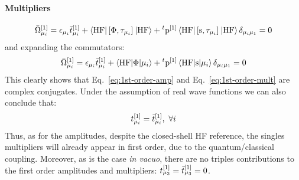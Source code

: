 \paragraph*{Multipliers}
\begin{equation}%
  \bar{\Omega}_{\mu_i}^{[1]} =
    \denom{\mu_i}\tbar{\mu_i}^{[1]}
    + \braket{\mathrm{HF} | \commutator{\Phi}{\cluster{\mu_i}} | \mathrm{HF}}
    + {}^t\p^{[1]}\braket{\mathrm{HF} |
    \commutator{\s}{\cluster{\mu_i}} | \mathrm{HF}}\delta_{\mu_i\mu_1} =0
\end{equation}
and expanding the commutators:
\begin{equation}\label{eq:1st-order-mult}
  \bar{\Omega}_{\mu_i}^{[1]} =
    \epsilon_{\mu_i}\bar{t}_{\mu_i}^{[1]}
    + \braket{\mathrm{HF} | \Phi | \mu_i}
    + {}^t\mathrm{p}^{[1]}\braket{\mathrm{HF} | \mathrm{s} | \mu_i}\delta_{\mu_i\mu_1} =0
\end{equation}
This clearly shows that Eq.~\eqref{eq:1st-order-amp}
and Eq.~\eqref{eq:1st-order-mult} are complex conjugates. Under the
assumption of real wave functions we can also conclude that:
\begin{equation}
  t_{\mu_i}^{[1]} = \bar{t}_{\mu_i}^{[1]},\,\,\forall i
\end{equation}
Thus, as for the amplitudes, despite the closed-shell \acrshort{HF} reference, the singles
multipliers will already appear in first order, due to the
quantum/classical coupling.
Moreover, as is the case \emph{in vacuo}, there are no triples contributions to
the first order amplitudes and multipliers: $t_{\mu_3}^{[1]} = \bar{t}_{\mu_3}^{[1]} = 0$.

